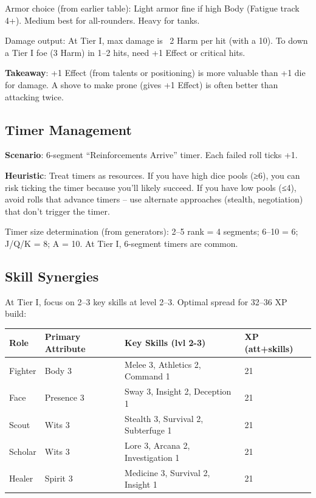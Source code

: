 \documentclass[11pt]{article}
\begin{document}
Armor choice (from earlier table): Light armor fine if high Body (Fatigue track 4+). Medium best for all-rounders. Heavy for tanks.

Damage output: At Tier I, max damage is ~2 Harm per hit (with a 10). To down a Tier I foe (3 Harm) in 1–2 hits, need +1 Effect or critical hits.

\textbf{Takeaway}: +1 Effect (from talents or positioning) is more valuable than +1 die for damage. A shove to make prone (gives +1 Effect) is often better than attacking twice.

\subsection{Timer Management}
\textbf{Scenario}: 6-segment ``Reinforcements Arrive'' timer. Each failed roll ticks +1.

\textbf{Heuristic}: Treat timers as resources. If you have high dice pools (≥6), you can risk ticking the timer because you'll likely succeed. If you have low pools (≤4), avoid rolls that advance timers – use alternate approaches (stealth, negotiation) that don't trigger the timer.

Timer size determination (from generators): 2–5 rank = 4 segments; 6–10 = 6; J/Q/K = 8; A = 10. At Tier I, 6-segment timers are common.

\subsection{Skill Synergies}
At Tier I, focus on 2–3 key skills at level 2–3. Optimal spread for 32–36 XP build:

\begin{table}[h]
\centering
\begin{tabular}{llll}
\toprule
\textbf{Role} & \textbf{Primary Attribute} & \textbf{Key Skills (lvl 2-3)} & \textbf{XP (att+skills)} \\
\midrule
Fighter & Body 3 & Melee 3, Athletics 2, Command 1 & 21 \\
Face & Presence 3 & Sway 3, Insight 2, Deception 1 & 21 \\
Scout & Wits 3 & Stealth 3, Survival 2, Subterfuge 1 & 21 \\
Scholar & Wits 3 & Lore 3, Arcana 2, Investigation 1 & 21 \\
Healer & Spirit 3 & Medicine 3, Survival 2, Insight 1 & 21 \\
\bottomrule
\end{tabular}
\end{table}
\end{document}
